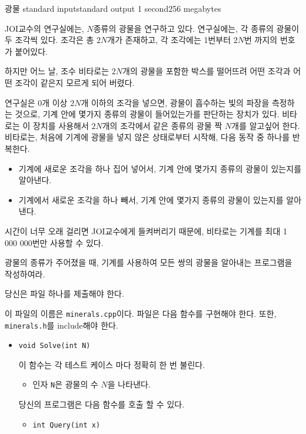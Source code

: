 \begin{problem}{광물}
	{standard input}{standard output}
	{1 second}{256 megabytes}{}
	
	JOI교수의 연구실에는, $N$종류의 광물을 연구하고 있다. 연구실에는, 각 종류의 광물이 두 조각씩 있다. 조각은 총 $2N$개가 존재하고, 각 조각에는 1번부터 $2N$번 까지의 번호가 붙어있다.
	
	하지만 어느 날, 조수 비타로는 $2N$개의 광물을 포함한 박스를 떨어뜨려 어떤 조각과 어떤 조각이 같은지 모르게 되어 버렸다. 
	
	연구실은 0개 이상 $2N$개 이하의 조각을 넣으면, 광물이 흡수하는 빛의 파장을 측정하는 것으로, 기계 안에 몇가지 종류의 광물이 들어있는가를 판단하는 장치가 있다. 비타로는 이 장치를 사용해서 $2N$개의 조각에서 같은 종류의 광물 짝 $N$개를 알고싶어 한다. 비타로는, 처음에 기계에 광물을 넣지 않은 상태로부터 시작해, 다음 동작 중 하나를 반복한다.
	
	\begin{itemize}
		\item 기계에 새로운 조각을 하나 집어 넣어서, 기계 안에 몇가지 종류의 광물이 있는지를 알아낸다.
		\item 기계에서 새로운 조각을 하나 빼서, 기계 안에 몇가지 종류의 광물이 있는지를 알아낸다.
	\end{itemize}

	시간이 너무 오래 걸리면 JOI교수에게 들켜버리기 때문에, 비타로는 기계를 최대 1 000 000번만 사용할 수 있다.
	
	광물의 종류가 주어졌을 때, 기계를 사용하여 모든 쌍의 광물을 알아내는 프로그램을 작성하여라.
	
	
	\Specification
	
	당신은 파일 하나를 제출해야 한다.
	
	이 파일의 이름은 \texttt{minerals.cpp}이다. 파일은 다음 함수를 구현해야 한다. 또한, \texttt{minerals.h}를 include해야 한다.
	
	\begin{itemize}
		\item \texttt{void Solve(int N)}
		
		이 함수는 각 테스트 케이스 마다 정확히 한 번 불린다.
		\begin{itemize}
			\item 인자 \texttt{N}은 광물의 수 $N$을 나타낸다.
		\end{itemize}
		
		당신의 프로그램은 다음 함수를 호출 할 수 있다.
		\begin{itemize}
			\item \texttt{int Query(int x)}
			

\end{itemize}
\end{itemize}
\end{problem}
